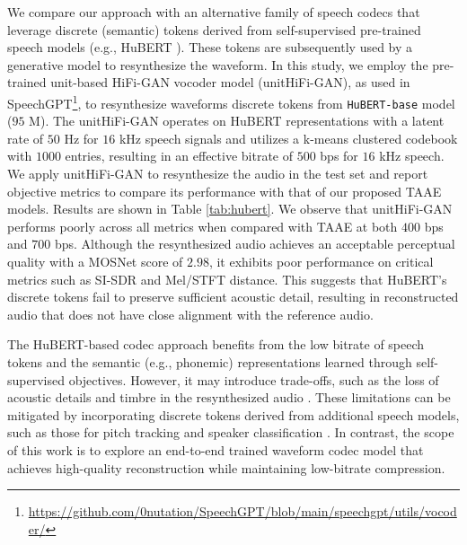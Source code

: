 \documentclass{article} %
\begin{document}
We compare our approach with an alternative family of speech codecs that leverage discrete (semantic) tokens derived from self-supervised pre-trained speech models (e.g., HuBERT \citep{hsu2021hubert}). These tokens are subsequently used by a generative model to resynthesize the waveform. In this study, we employ the pre-trained unit-based HiFi-GAN vocoder \citep{kong2020hifi} model (unitHiFi-GAN), as used in SpeechGPT\footnote{\url{https://github.com/0nutation/SpeechGPT/blob/main/speechgpt/utils/vocoder/}}, to resynthesize waveforms discrete tokens from \texttt{HuBERT-base} model ($95$ M). The unitHiFi-GAN operates on HuBERT representations with a latent rate of $50$ Hz for $16$ kHz speech signals and utilizes a k-means clustered codebook with $1000$ entries, resulting in an effective bitrate of $500$ bps for $16$ kHz speech. We apply unitHiFi-GAN to resynthesize the audio in the test set and report objective metrics to compare its performance with that of our proposed TAAE models. Results are shown in Table \ref{tab:hubert}. We observe that unitHiFi-GAN performs poorly across all metrics when compared with TAAE at both $400$ bps and $700$ bps. Although the resynthesized audio achieves an acceptable perceptual quality with a MOSNet score of $2.98$, it exhibits poor performance on critical metrics such as SI-SDR and Mel/STFT distance. This suggests that HuBERT's discrete tokens fail to preserve sufficient acoustic detail, resulting in reconstructed audio that does not have close alignment with the reference audio. 

The HuBERT-based codec approach benefits from the low bitrate of speech tokens and the semantic (e.g., phonemic) representations learned through self-supervised objectives. However, it may introduce trade-offs, such as the loss of acoustic details and timbre in the resynthesized audio \citep{mousavi2024should}. These limitations can be mitigated by incorporating discrete tokens derived from additional speech models, such as those for pitch tracking and speaker classification \citep{polyak2021speech}. In contrast, the scope of this work is to explore an end-to-end trained waveform codec model that achieves high-quality reconstruction while maintaining low-bitrate compression.
\end{document}
